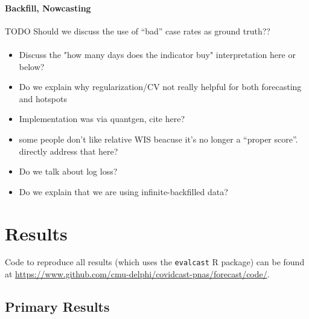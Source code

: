 \documentclass[9pt,twocolumn,twoside,lineno]{pnas-new}
\begin{document}
\paragraph{Backfill, Nowcasting}

TODO Should we discuss the use of ``bad'' case rates as ground truth?? 

\paragraph{}

\begin{itemize}
\item Discuss the "how many days does the indicator buy" interpretation here or below? 


\item Do we explain why regularization/CV not really helpful for both
forecasting and hotspots


\item Implementation was via quantgen, cite here?

\item some people don't like relative WIS beacuse it's no longer a
``proper score''.  directly address that here?


\item Do we talk about log loss?

\item Do we explain that we are using infinite-backfilled data?


\end{itemize}



\section{Results}

Code to reproduce all results (which uses the \texttt{evalcast} R package) can 
be found at
\url{https://www.github.com/cmu-delphi/covidcast-pnas/forecast/code/}. 

\subsection{Primary Results}
\end{document}
